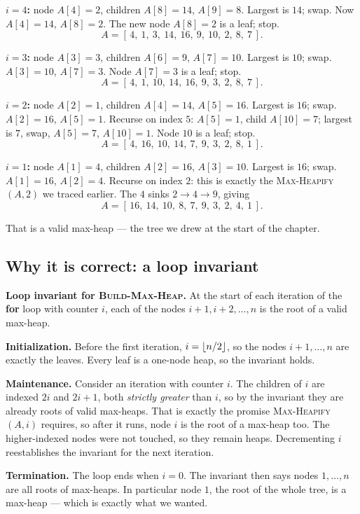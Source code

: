\textbf{$i=4$:} node $A[4]=2$, children $A[8]=14$, $A[9]=8$. Largest is $14$;
swap. Now $A[4]=14$, $A[8]=2$. The new node $A[8]=2$ is a leaf; stop.
\[
  A = [\,4,\ 1,\ 3,\ 14,\ 16,\ 9,\ 10,\ 2,\ 8,\ 7\,].
\]

\textbf{$i=3$:} node $A[3]=3$, children $A[6]=9$, $A[7]=10$. Largest is $10$;
swap. $A[3]=10$, $A[7]=3$. Node $A[7]=3$ is a leaf; stop.
\[
  A = [\,4,\ 1,\ 10,\ 14,\ 16,\ 9,\ 3,\ 2,\ 8,\ 7\,].
\]

\textbf{$i=2$:} node $A[2]=1$, children $A[4]=14$, $A[5]=16$. Largest is $16$;
swap. $A[2]=16$, $A[5]=1$. Recurse on index $5$: $A[5]=1$, child $A[10]=7$;
largest is $7$, swap, $A[5]=7$, $A[10]=1$. Node $10$ is a leaf; stop.
\[
  A = [\,4,\ 16,\ 10,\ 14,\ 7,\ 9,\ 3,\ 2,\ 8,\ 1\,].
\]

\textbf{$i=1$:} node $A[1]=4$, children $A[2]=16$, $A[3]=10$. Largest is $16$;
swap. $A[1]=16$, $A[2]=4$. Recurse on index $2$: this is exactly the
\textsc{Max-Heapify}$(A,2)$ we traced earlier. The $4$ sinks $2\to 4\to 9$,
giving
\[
  A = [\,16,\ 14,\ 10,\ 8,\ 7,\ 9,\ 3,\ 2,\ 4,\ 1\,].
\]

That is a valid max-heap --- the tree we drew at the start of the chapter.

\subsection{Why it is correct: a loop invariant}

\begin{formalbox}
\textbf{Loop invariant for \textsc{Build-Max-Heap}.} At the start of each
iteration of the \textbf{for} loop with counter $i$, each of the nodes
$i+1, i+2, \ldots, n$ is the root of a valid max-heap.
\end{formalbox}

\textbf{Initialization.} Before the first iteration, $i = \lfloor n/2\rfloor$, so the
nodes $i+1,\ldots,n$ are exactly the leaves. Every leaf is a one-node heap, so
the invariant holds.

\textbf{Maintenance.} Consider an iteration with counter $i$. The children of $i$
are indexed $2i$ and $2i+1$, both \emph{strictly greater} than $i$, so by the
invariant they are already roots of valid max-heaps. That is exactly the promise
\textsc{Max-Heapify}$(A,i)$ requires, so after it runs, node $i$ is the root of a
max-heap too. The higher-indexed nodes were not touched, so they remain heaps.
Decrementing $i$ reestablishes the invariant for the next iteration.

\textbf{Termination.} The loop ends when $i=0$. The invariant then says nodes
$1,\ldots,n$ are all roots of max-heaps. In particular node $1$, the root of the
whole tree, is a max-heap --- which is exactly what we wanted.

